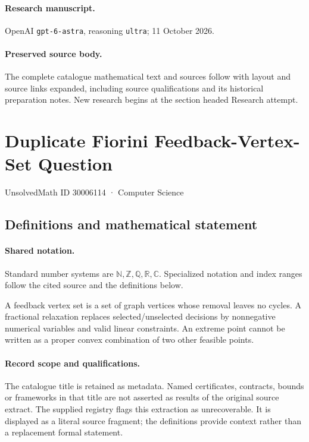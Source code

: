 \documentclass[11pt]{article}
\begin{document}
\paragraph{Research manuscript.} OpenAI \texttt{gpt-6-astra}, reasoning \texttt{ultra}; 11 October 2026.
\paragraph{Preserved source body.} The complete catalogue mathematical text and sources follow with layout and source links expanded, including source qualifications and its historical preparation notes. New research begins at the section headed Research attempt.

\section{Duplicate Fiorini Feedback-Vertex-Set Question}\label{30006114}
{\small UnsolvedMath ID 30006114 · Computer Science}
\subsection{Definitions and mathematical statement}

\paragraph{Shared notation.}Standard number systems are $\mathbb N,\mathbb Z,\mathbb Q,\mathbb R,\mathbb C$. Specialized notation and index ranges follow the cited source and the definitions below.


A feedback vertex set is a set of graph vertices whose removal leaves no cycles. A fractional relaxation replaces selected/unselected decisions by nonnegative numerical variables and valid linear constraints. An extreme point cannot be written as a proper convex combination of two other feasible points.
\paragraph{Record scope and qualifications.}
The catalogue title is retained as metadata. Named certificates, contracts, bounds or frameworks in that title are not asserted as results of the original source extract.
The supplied registry flags this extraction as unrecoverable. It is displayed as a literal source fragment; the definitions provide context rather than a replacement formal statement.
\end{document}
